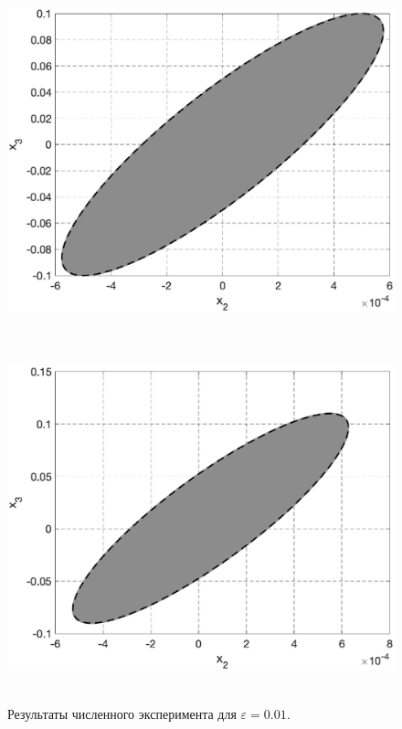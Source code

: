 \documentclass[../main.tex]{subfiles}
\begin{document}
\begin{figure}[ht!]
\begin{minipage}[b]{.49\linewidth}
			\label{fig:u=1_x1-x3}  
		\end{minipage} 
		\vfill
		\hspace{-2.5ex}
		\begin{minipage}[b]{.49\linewidth} 
			\small
			\centering 
			\includegraphics[width=\linewidth]{images/OsipovI_u=0_x2-x3.eps}
			\label{fig:u=0_x2-x3} 
		\end{minipage}
		\hfill
		\begin{minipage}[b]{.49\linewidth} 
			\small
			\centering
			\includegraphics[width=\linewidth]{images/OsipovI_u=1_x2-x3.eps}
			\label{fig:u=1_x2-x3}  
		\end{minipage}
		\caption{Результаты численного эксперимента для $ \varepsilon = 0.01 $.}\label{fig:RS}
	\end{figure}
	
\end{document}
